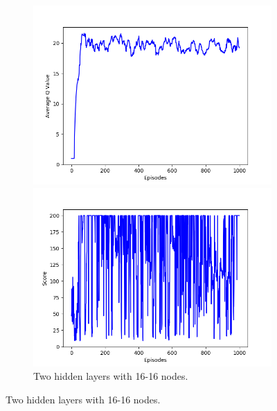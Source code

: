 \documentclass{article}
\begin{document}
\begin{figure}[!htbp]
  \centering
  \begin{subfigure}{\textwidth}
    \begin{minipage}{0.5\textwidth}
      \centering
      \includegraphics[scale=0.45]{../experiments/nn_size_16_16/qvalues.png}
    \end{minipage}
    \begin{minipage}{0.5\textwidth}
      \centering
      \includegraphics[scale=0.45]{../experiments/nn_size_16_16/scores.png}
    \end{minipage}
    \caption{Two hidden layers with 16-16 nodes.}
  \end{subfigure}%


\end{figure}
\end{document}
